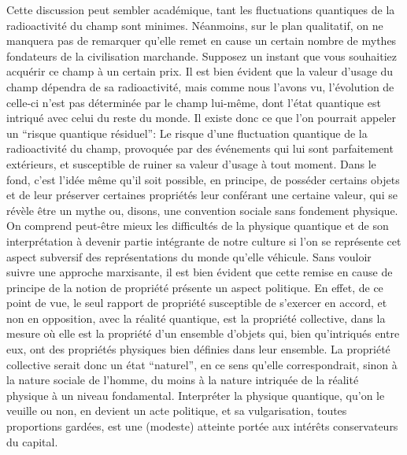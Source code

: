 Cette discussion peut sembler académique,
tant les fluctuations quantiques de la radioactivité du champ sont minimes.
Néanmoins, sur le plan qualitatif, on ne manquera pas de remarquer qu'elle remet en cause un certain nombre de mythes
fondateurs de la civilisation marchande.
Supposez un instant que vous souhaitiez acquérir ce champ à un certain prix.
Il est bien évident que la valeur d'usage du champ dépendra de sa radioactivité,
mais comme nous l'avons vu,
l'évolution de celle-ci n'est pas déterminée par le champ lui-même,
dont l'état quantique est intriqué avec celui du reste du monde.
Il existe donc ce que l'on pourrait appeler un ``risque quantique résiduel'':
Le risque d'une fluctuation quantique de la radioactivité du champ,
provoquée par des événements qui lui sont parfaitement extérieurs,
et susceptible de ruiner sa valeur d'usage à tout moment.
Dans le fond, c'est l'idée même qu'il soit possible, en principe,
de posséder certains objets et de leur préserver certaines propriétés leur conférant une certaine valeur,
qui se révèle être un mythe ou, disons, une convention sociale sans fondement physique.
On comprend peut-être mieux les difficultés de la physique quantique et de son interprétation à devenir partie
intégrante de notre culture si l'on se représente cet aspect subversif des représentations du monde qu'elle véhicule.
Sans vouloir suivre une approche marxisante,
il est bien évident que cette remise en cause de principe de la notion de propriété présente un aspect politique.
En effet, de ce point de vue, le seul rapport de propriété susceptible de s'exercer en accord, et non en opposition,
avec la réalité quantique, est la propriété collective,
dans la mesure où elle est la propriété d'un ensemble d'objets qui,
bien qu'intriqués entre eux,
ont des propriétés physiques bien définies dans leur ensemble.
La propriété collective serait donc un état ``naturel'', en ce sens qu'elle correspondrait,
sinon à la nature sociale de l'homme,
du moins à la nature intriquée de la réalité physique à un niveau fondamental.
Interpréter la physique quantique, qu'on le veuille ou non, en devient un acte politique, et sa vulgarisation,
toutes proportions gardées, est une (modeste) atteinte portée aux intérêts conservateurs du capital.
